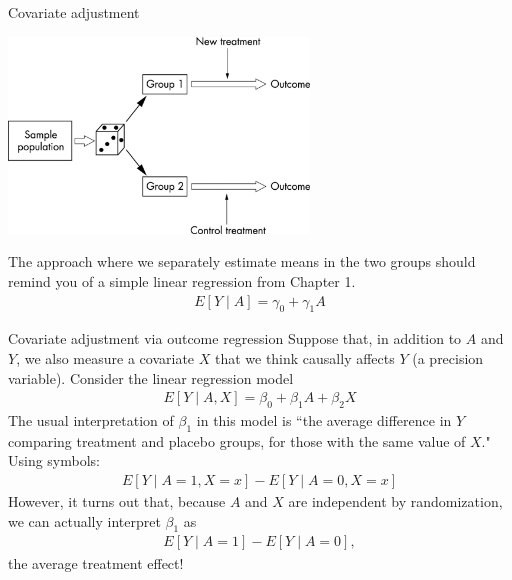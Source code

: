 \documentclass[10pt,t]{beamer}
\begin{document}
\begin{frame}{Covariate adjustment}
	\vspace{-0.8cm}
	\begin{center}
		\includegraphics[width = 0.6\textwidth]{rct.jpg}
	\end{center}
	The approach where we separately estimate means in the two groups should remind you of a simple linear regression from Chapter 1. 
	\begin{align*}
		E[Y \mid A ] = \gamma_0 + \gamma_1 A
	\end{align*} 
\end{frame}

\begin{frame}{Covariate adjustment via outcome regression}
	Suppose that, in addition to $A$ and $Y$, we also measure a covariate $X$ that we think causally affects $Y$ (a precision variable). Consider the linear regression model
	\begin{align*}
		E[Y \mid A, X] = \beta_0 + \beta_1 A + \beta_2 X
	\end{align*}
	The usual interpretation of $\beta_1$ in this model is ``the average difference in $Y$ comparing treatment and placebo groups, for those with the same value of $X$." Using symbols:
	\begin{align*}
		E[Y \mid A = 1, X = x] - E[Y \mid A = 0, X = x]
	\end{align*}
	However, it turns out that, because $A$ and $X$ are independent by randomization, we can actually interpret $\beta_1$ as
	\begin{align*}
		E[Y \mid A = 1] - E[Y \mid A = 0],
	\end{align*}
	the average treatment effect!
\end{frame}
\end{document}
